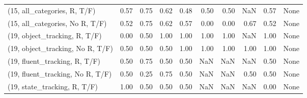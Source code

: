 \begin{table*}[h!]
\begin{adjustbox}{width=2\columnwidth,center}
\begin{tabular}{lrrr|rrr|rrr}
(15, all\_categories, R, T/F)          &                      0.57 &                  0.75 &                      0.62 &                          0.48 &                      0.50 &                          0.50 &                                    NaN &                               0.57 &                                  None \\
(15, all\_categories, No R, T/F)       &                      0.52 &                  0.75 &                      0.62 &                          0.57 &                      0.00 &                          0.00 &                                   0.67 &                               0.52 &                                  None \\



\midrule
(19, object\_tracking, R, T/F)         &                      0.00 &                  0.50 &                      1.00 &                          1.00 &                      1.00 &                          1.00 &                                    NaN &                               1.00 &                                  None \\
(19, object\_tracking, No R, T/F)      &                      0.50 &                  0.50 &                      0.50 &                          1.00 &                      1.00 &                          1.00 &                                   1.00 &                               1.00 &                                  None \\
(19, fluent\_tracking, R, T/F)         &                      0.50 &                  0.75 &                      0.50 &                          0.50 &                       NaN &                           NaN &                                    NaN &                               0.50 &                                  None \\
(19, fluent\_tracking, No R, T/F)      &                      0.50 &                  0.25 &                      0.75 &                          0.50 &                       NaN &                           NaN &                                   0.50 &                               0.50 &                                  None \\
(19, state\_tracking, R, T/F)          &                      1.00 &                  0.50 &                      0.50 &                          0.50 &                       NaN &                           NaN &                                    NaN &                               0.00 &                                  None \\

\end{tabular}
\end{adjustbox}
\end{table*}
